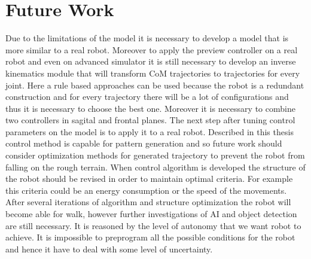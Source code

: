 \documentclass[12pt,a4paper]{report}
\begin{document}
	\chapter{Future Work}
		Due to the limitations of the model it is necessary to develop a model that is more similar to a real robot. Moreover to apply the preview controller on a real robot and even on advanced simulator it is still necessary to develop an inverse kinematics module that will transform CoM trajectories to trajectories for every joint. Here a rule based approaches can be used because the robot is a redundant construction and for every trajectory there will be a lot of configurations and thus it is necessary to choose the best one. Moreover it is necessary to combine two controllers in sagital and frontal planes.
		The next step after tuning control parameters on the model is to apply it to a real robot.
		Described in this thesis control method is capable for pattern generation and so future work should consider optimization methods for generated trajectory to prevent the robot from falling on the rough terrain.
		When control algorithm is developed the structure of the robot should be revised in order to maintain optimal criteria. For example this criteria could be an energy consumption or the speed of the movements.
		After several iterations of algorithm and structure optimization the robot will become able for walk, however further investigations of AI and object detection are still necessary. It is reasoned by the level of autonomy that we want robot to achieve. It is impossible to preprogram all the possible conditions for the robot and hence it have to deal with some level of uncertainty.
\end{document}
